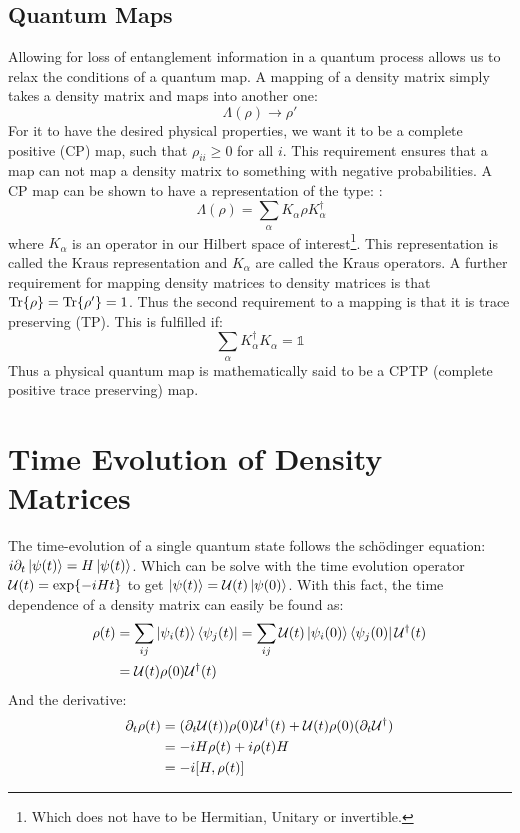 \subsection{Quantum Maps}
Allowing for loss of entanglement information in a quantum process allows us to relax the conditions of a quantum map. A mapping of a density matrix simply takes a density matrix and maps into another one:
\begin{equation}
    \Lambda(\rho) \to \rho'
\end{equation}
For it to have the desired physical properties, we want it to be a complete positive (CP) map, such that $\rho_{ii} \geq 0$ for all $i$. This requirement ensures that a map can not map a density matrix to something with negative probabilities. A CP map can be shown to have a representation of the type: \cite{greenbaum_introduction_2015}:
\begin{equation}\
    \Lambda(\rho) = \sum_\alpha K_\alpha\rho K_\alpha^\dagger
\end{equation}
where $K_\alpha$ is an operator in our Hilbert space of interest\footnote{Which does not have to be Hermitian, Unitary or invertible.}. This representation is called the Kraus representation and $K_\alpha$ are called the Kraus operators. A further requirement for mapping density matrices to density matrices is that $\Tr{\rho} = \Tr{\rho'} = 1$. Thus the second requirement to a mapping is that it is trace preserving (TP). This is fulfilled if:
\begin{equation}
    \sum_\alpha K_\alpha^\dagger K_\alpha = \mathbb{1}
\end{equation}
Thus a physical quantum map is mathematically said to be a CPTP (complete positive trace preserving) map.  

\section{Time Evolution of Density Matrices} \label{sec: Time Evolution}
The time-evolution of a single quantum state follows the schödinger equation: $i\partial_t\ket{\psi(t)} = H\ket{\psi(t)}$. Which can be solve with the time evolution operator $\mathcal{U}(t) = \exp{-iHt}$ to get $\ket{\psi(t)} = \mathcal{U}(t)\ket{\psi(0)}$. With this fact, the time dependence of a density matrix can easily be found as:
\begin{align}
    \rho(t) &= \sum_{ij} \ket{\psi_i(t)}\bra{\psi_j(t)} = \sum_{ij} \mathcal{U}(t) \ket{\psi_i(0)}\bra{\psi_j(0)} \mathcal{U}^\dagger(t) \nonumber \\
    &= \mathcal{U}(t) \rho(0) \mathcal{U}^\dagger(t)
\end{align}
And the derivative:
\begin{align}
    \partial_t \rho(t) &= (\partial_t \unitary(t)) \rho(0)\unitary^\dagger(t) + \unitary(t)\rho(0)(\partial_t \unitary^\dagger) \nonumber \\
    &= -iH \rho(t) +i \rho(t) H \nonumber \\
    &= - i \comm{H}{\rho(t)}
\end{align}

